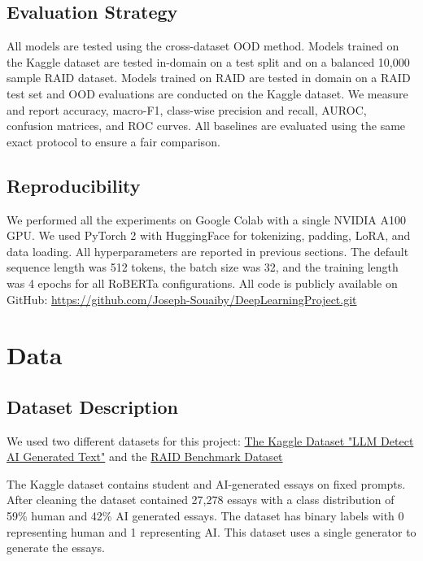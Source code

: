 \documentclass{article}
\begin{document}
\subsection{Evaluation Strategy}
All models are tested using the cross-dataset OOD method. Models trained on the Kaggle dataset are tested in-domain on a test split and on a balanced 10,000 sample RAID dataset. Models trained on RAID are tested in domain on a RAID test set and OOD evaluations are conducted on the Kaggle dataset. We measure and report accuracy, macro-F1, class-wise precision and recall, AUROC, confusion matrices, and ROC curves. All baselines are evaluated using the same exact protocol to ensure a fair comparison.
\subsection{Reproducibility}
We performed all the experiments on Google Colab with a single NVIDIA A100 GPU. We used PyTorch 2 with HuggingFace for tokenizing, padding, LoRA, and data loading. All hyperparameters are reported in previous sections. The default sequence length was 512 tokens, the batch size was 32, and the training length was 4 epochs for all RoBERTa configurations. All code is publicly available on GitHub: \url{https://github.com/Joseph-Souaiby/DeepLearningProject.git}

\section{Data}

\subsection{Dataset Description}
We used two different datasets for this project: \href{https://www.kaggle.com/datasets/sunilthite/llm-detect-ai-generated-text-dataset}{The Kaggle Dataset "LLM Detect AI Generated Text"} \citep{thite2026kaggle} and the \href{https://huggingface.co/datasets/liamdugan/raid}{RAID Benchmark Dataset}

The Kaggle dataset contains student and AI-generated essays on fixed prompts. After cleaning the dataset contained 27,278 essays with a class distribution of 59\% human and 42\% AI generated essays. The dataset has binary labels with 0 representing human and 1 representing AI. This dataset uses a single generator to generate the essays.
\end{document}
